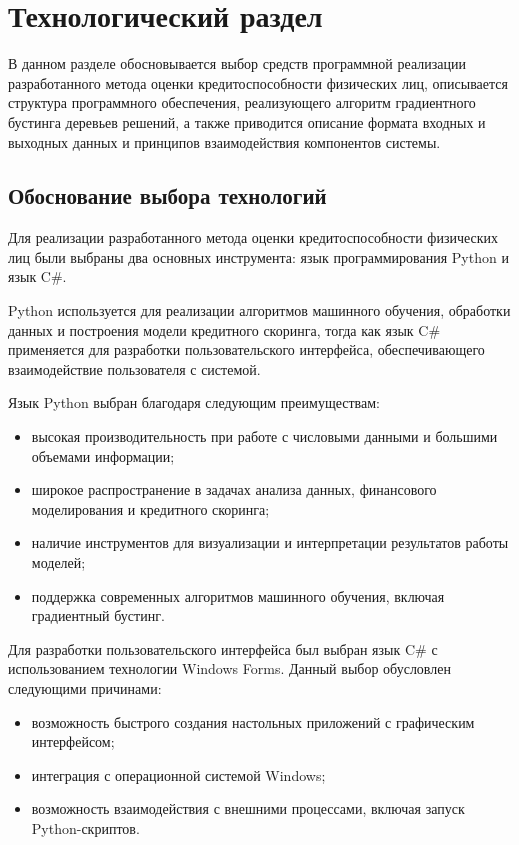 \section{Технологический раздел}

В данном разделе обосновывается выбор средств программной реализации разработанного метода оценки кредитоспособности физических лиц, описывается структура программного обеспечения, реализующего алгоритм градиентного бустинга деревьев решений, а также приводится описание формата входных и выходных данных и принципов взаимодействия компонентов системы.

\subsection{Обоснование выбора технологий}

Для реализации разработанного метода оценки кредитоспособности физических лиц были выбраны два основных инструмента: язык программирования Python и язык C\#.

Python используется для реализации алгоритмов машинного обучения, обработки данных и построения модели кредитного скоринга, тогда как язык C\# применяется для разработки пользовательского интерфейса, обеспечивающего взаимодействие пользователя с системой.

Язык Python выбран благодаря следующим преимуществам:
\begin{itemize}
  \item высокая производительность при работе с числовыми данными и большими объемами информации;
  \item широкое распространение в задачах анализа данных, финансового моделирования и кредитного скоринга;
  \item наличие инструментов для визуализации и интерпретации результатов работы моделей;
  \item поддержка современных алгоритмов машинного обучения, включая градиентный бустинг.
\end{itemize}

Для разработки пользовательского интерфейса был выбран язык C\# с использованием технологии Windows Forms. Данный выбор обусловлен следующими причинами:

\begin{itemize}
  \item возможность быстрого создания настольных приложений с графическим интерфейсом;
  \item интеграция с операционной системой Windows;
  \item возможность взаимодействия с внешними процессами, включая запуск Python-скриптов.
\end{itemize}

